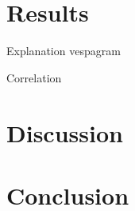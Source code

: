 \documentclass[draft]{agujournal2018}
\begin{document}
\section{Results}

Explanation vespagram

Correlation

\section{Discussion}

\section{Conclusion}





%
%
%
%
%
%
%
%
%
%
\end{document}
